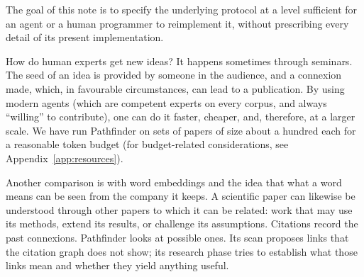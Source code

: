 \documentclass[11pt,a4paper]{article}
\newcommand{\st}[1]{\textsc{#1}}
\begin{document}
The goal of this note is to specify the underlying protocol at a level sufficient for an
agent or a human programmer to reimplement it, without prescribing
every detail of its present implementation.






How do human experts get new ideas? It happens sometimes through seminars. The
seed of an idea is provided by someone in the audience, and a connexion made,
which, in favourable circumstances, can lead to a publication. By using modern
agents (which are competent experts on every corpus, and always ``willing'' to
contribute), one can do it faster, cheaper, and, therefore, at a larger scale.
We have run Pathfinder on sets of papers of size about a hundred each for a
reasonable token budget (for budget-related considerations, see Appendix~\ref{app:resources}).

Another comparison is with word embeddings and the idea that what a
word means can be seen from the company it keeps. A scientific paper can likewise be
understood through other papers to which it can be related: work that may
use its methods, extend its results, or challenge its assumptions. Citations
record the past connexions. Pathfinder looks at possible ones. Its scan
proposes links that the citation graph does not show; its research phase tries
to establish what those links mean and whether they yield anything useful.
\end{document}
